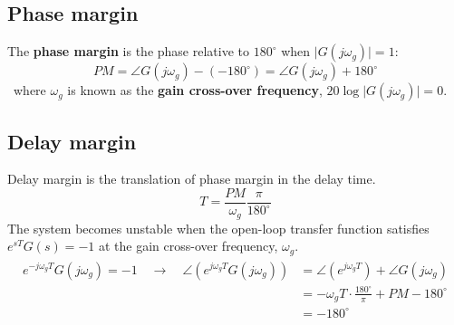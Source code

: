 \subsection{Phase margin}
The \textbf{phase margin} is the phase relative to $180^{\circ}$ when $\lvert G(j\omega_{g}) \rvert =1$:
\[ PM = \angle G(j\omega_{g})-(-180^{\circ}) =\angle G(j\omega_{g})+ 180^{\circ}\] 
\ where $\omega_{g}$ is known as the \textbf{gain cross-over frequency}, $20\log \lvert G(j\omega_{g})\rvert = 0$.

\subsection{Delay margin}
Delay margin is the translation of phase margin in the delay time.
\[T = \frac{PM}{\omega_{g}}\frac{\pi}{180^{\circ}}\]
The system becomes unstable when the open-loop transfer function satisfies $e^{sT}G(s) = -1$ at the gain cross-over frequency, $\omega_{g}$.
\begin{align*}
\begin{split}
e^{-j\omega_{g}T}G(j\omega_{g})=-1
\quad \longrightarrow \quad 
 \angle (e^{j\omega_{g}T} G(j\omega_{g}))&= \angle (e^{j\omega_{g}T})+\angle G(j\omega_{g}) \\
&= -\omega_{g}T\cdot \frac{180^{\circ}}{\pi}+PM-180^{\circ} \\
&= -180^{\circ}
\end{split}
\end{align*}

\newpage
